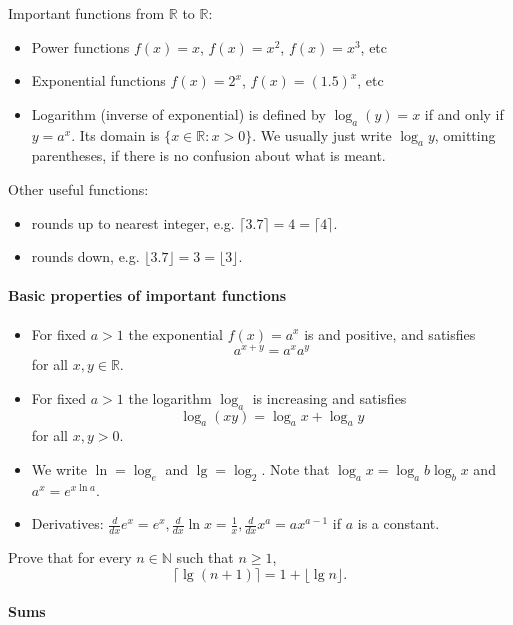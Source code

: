 Important functions from $\mathbb{R}$ to $\mathbb{R}$: 
\begin{itemize}
\item Power functions $f(x) = x$, $f(x) = x^2$, $f(x) = x^3$, etc
\item Exponential functions $f(x) = 2^x$, $f(x) = (1.5)^x$, etc
\item Logarithm (inverse of exponential) is defined by $\log_a (y) = x$ if and only if $y = a^x$. Its domain is $\{x\in \mathbb{R} : x > 0\}$. We usually just write $\log_a y$, omitting parentheses, if there is no confusion about what is meant.
\end{itemize}

Other useful functions: 
\begin{itemize}
\item {} rounds up to nearest integer, e.g. $\lceil 3.7 \rceil = 4 = \lceil 4 \rceil$. 
\item {} rounds down, e.g. $\lfloor 3.7 \rfloor= 3 = \lfloor 3 \rfloor$.
\end{itemize}



\paragraph{Basic properties of important functions}
\begin{itemize}
\item For fixed $a>1$ the exponential $f(x) = a^x$ is  and positive, and satisfies $$a^{x+y} = a^x a^y$$ for all $x,y\in \mathbb{R}$. 
\item For fixed $a>1$ the logarithm $\log_a$ is increasing and satisfies 
$$\log_a(xy) = \log_a x + \log_a y$$ for all $x,y>0$.
\item We write $\ln = \log_e$ and $\lg = \log_2$. Note that $\log_a x = \log_a b \log_b x$ and $a^x = e^{x\ln a}$.
\item Derivatives: $\frac{d}{dx} e^x = e^x, \frac{d}{dx} \ln x = \frac{1}{x},  \frac{d}{dx} x^a = ax^{a-1}$ if $a$ is a constant.
\end{itemize}

\begin{Boxample}[4]
Prove that for every $n\in \mathbb{N}$ such that $n\geq 1$,
$$
\lceil \lg (n+1) \rceil = 1 + \lfloor \lg n \rfloor.
$$

\end{Boxample}

\paragraph{Sums}


